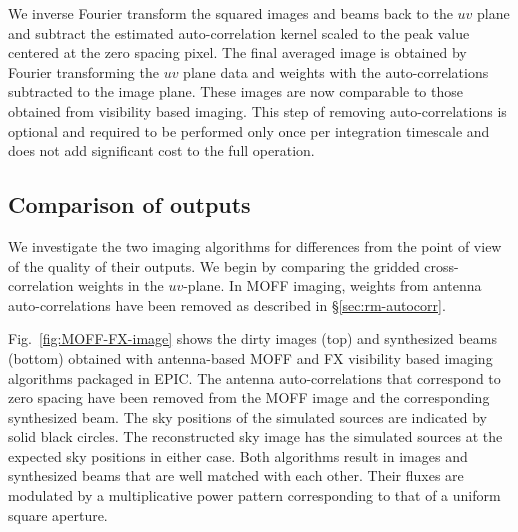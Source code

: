 \documentclass[a4paper,fleqn,usenatbib]{mnras}
\begin{document}
We inverse Fourier transform the squared images and beams back to the $uv$ 
plane and subtract the estimated auto-correlation kernel scaled to the peak 
value centered at the zero spacing pixel. The final averaged image is obtained 
by Fourier transforming the $uv$ plane data and weights with the 
auto-correlations subtracted to the image plane. These images are now comparable 
to those obtained from visibility based imaging. This step of removing 
auto-correlations is optional and required to be performed only once per 
integration timescale and does not add significant cost to the full operation.

\subsection{Comparison of outputs}\label{sec:diff}

We investigate the two imaging algorithms for differences from the point of 
view of the quality of their outputs. We begin by comparing the gridded 
cross-correlation weights in the $uv$-plane. In MOFF imaging, weights 
from antenna auto-correlations have been removed as described in 
\S\ref{sec:rm-autocorr}. 

Fig.~\ref{fig:MOFF-FX-image} shows the dirty images (top) and synthesized beams
(bottom) obtained with antenna-based MOFF and FX visibility based imaging 
algorithms packaged in EPIC. The antenna auto-correlations that correspond to 
zero spacing have been removed from the MOFF image and the corresponding 
synthesized beam. The sky positions of the simulated sources are indicated by 
solid black circles. The reconstructed sky image has the simulated sources at the
expected sky positions in either case. Both algorithms result in images and 
synthesized beams that are well matched with each other. Their fluxes are 
modulated by a multiplicative power pattern corresponding to that of a uniform
square aperture. 
\end{document}
